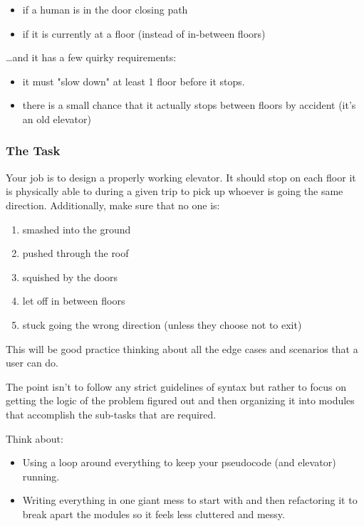\documentclass[11pt]{article}
\begin{document}
\begin{itemize}
\item if a human is in the door closing path
\item if it is currently at a floor (instead of in-between floors)
\end{itemize}


\ldots{}and it has a few quirky requirements:

\begin{itemize}
\item it must "slow down" at least 1 floor before it stops.
\item there is a small chance that it actually stops between floors by 
accident (it's an old elevator)
\end{itemize}

\subsubsection{The Task}
\label{sec-2-1-2}

Your job is to design a properly working elevator. It should stop on each 
floor it is physically able to during a given trip to pick up whoever is 
going the same direction. Additionally, make sure that no one is:

\begin{enumerate}
\item smashed into the ground
\item pushed through the roof
\item squished by the doors
\item let off in between floors
\item stuck going the wrong direction (unless they choose not to exit)
\end{enumerate}


This will be good practice thinking about all the edge cases and scenarios 
that a user can do.

The point isn't to follow any strict guidelines of syntax but rather to 
focus on getting the logic of the problem figured out and then organizing it
into modules that accomplish the sub-tasks that are required.

Think about:

\begin{itemize}
\item Using a loop around everything to keep your pseudocode (and elevator) 
running.
\item Writing everything in one giant mess to start with and then refactoring it
to break apart the modules so it feels less cluttered and messy.
\end{itemize}
\end{document}
